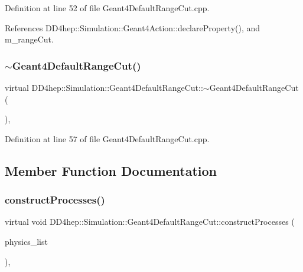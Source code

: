 Definition at line 52 of file Geant4\+Default\+Range\+Cut.\+cpp.



References D\+D4hep\+::\+Simulation\+::\+Geant4\+Action\+::declare\+Property(), and m\+\_\+range\+Cut.

\hypertarget{class_d_d4hep_1_1_simulation_1_1_geant4_default_range_cut_a32d4c8eb8988913c4ed1c8ad6e2ab893}{}\label{class_d_d4hep_1_1_simulation_1_1_geant4_default_range_cut_a32d4c8eb8988913c4ed1c8ad6e2ab893} 
\subsubsection{\texorpdfstring{$\sim$\+Geant4\+Default\+Range\+Cut()}{~Geant4DefaultRangeCut()}}
{\footnotesize\ttfamily virtual D\+D4hep\+::\+Simulation\+::\+Geant4\+Default\+Range\+Cut\+::$\sim$\+Geant4\+Default\+Range\+Cut (\begin{DoxyParamCaption}{ }\end{DoxyParamCaption})\hspace{0.3cm}{\ttfamily [inline]}, {\ttfamily [virtual]}}



Definition at line 57 of file Geant4\+Default\+Range\+Cut.\+cpp.



\subsection{Member Function Documentation}
\hypertarget{class_d_d4hep_1_1_simulation_1_1_geant4_default_range_cut_a5625f1bf8f0c47bb6b29c73ce3e590eb}{}\label{class_d_d4hep_1_1_simulation_1_1_geant4_default_range_cut_a5625f1bf8f0c47bb6b29c73ce3e590eb} 
\subsubsection{\texorpdfstring{construct\+Processes()}{constructProcesses()}}
{\footnotesize\ttfamily virtual void D\+D4hep\+::\+Simulation\+::\+Geant4\+Default\+Range\+Cut\+::construct\+Processes (\begin{DoxyParamCaption}\item[{G4\+V\+User\+Physics\+List $\ast$}]{physics\+\_\+list }\end{DoxyParamCaption})\hspace{0.3cm}{\ttfamily [inline]}, {\ttfamily [virtual]}}



